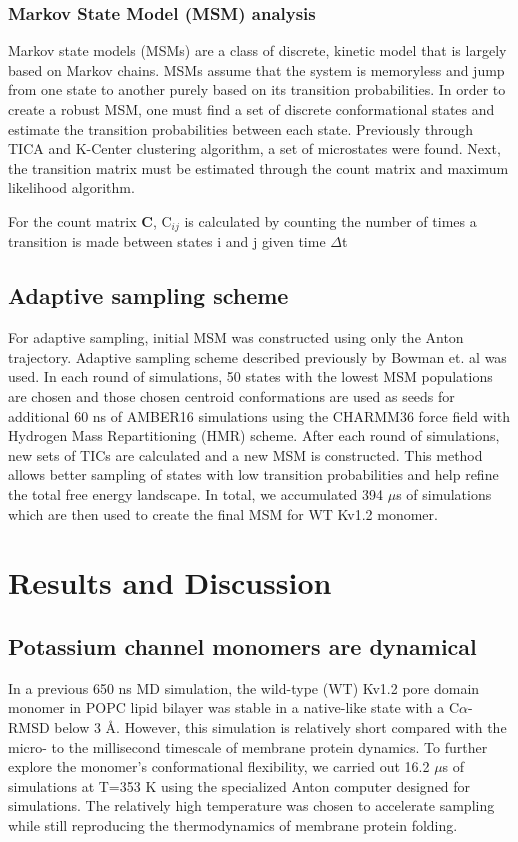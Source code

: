 \subsubsection{Markov State Model (MSM) analysis}
Markov state models (MSMs) are a class of discrete, kinetic model that is largely based on Markov chains. MSMs assume that the system is memoryless and jump from one state to another purely based on its transition probabilities. In order to create a robust MSM, one must find a set of discrete conformational states and estimate the transition probabilities between each state. Previously through TICA and K-Center clustering algorithm, a set of microstates were found. Next, the transition matrix must be estimated through the count matrix and maximum likelihood algorithm.

For the count matrix \textbf{C}, C$_{ij}$ is calculated by counting the number of times a transition is made between states i and j given time $\Delta$t


\subsection{Adaptive sampling scheme}
For adaptive sampling, initial MSM was constructed using only the Anton trajectory. Adaptive sampling scheme described previously by Bowman et. al was used. \citep{bowman2010} In each round of simulations, 50 states with the lowest MSM populations are chosen and those chosen centroid conformations are used as seeds for additional 60 ns of AMBER16 simulations using the CHARMM36 force field with Hydrogen Mass Repartitioning (HMR) scheme. After each round of simulations, new sets of TICs are calculated and a new MSM is constructed. This method allows better sampling of states with low transition probabilities and help refine the total free energy landscape. In total, we accumulated 394 $\mu$s of simulations which are then used to create the final MSM for WT Kv1.2 monomer. 

\section{Results and Discussion}
\subsection{Potassium channel monomers are dynamical}
In a previous 650 ns MD simulation, the wild-type (WT) Kv1.2 pore domain monomer in POPC lipid bilayer was stable in a native-like state with a C$\alpha$-RMSD below 3 \AA. \cite{gajewski2011} However, this simulation is relatively short compared with the micro- to the millisecond timescale of membrane protein dynamics. \citep{booth1995} To further explore the monomer’s conformational flexibility, we carried out 16.2 $\mu$s of simulations at T=353 K using the specialized Anton computer designed for simulations.\citep{shaw2009} The relatively high temperature was chosen to accelerate sampling while still reproducing the thermodynamics of membrane protein folding.

